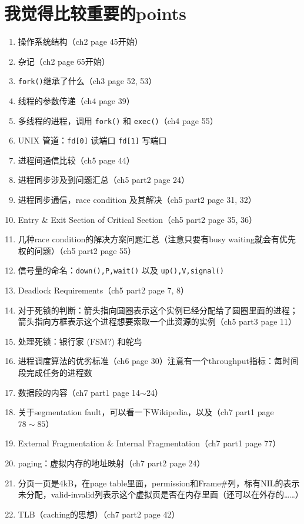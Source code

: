 \documentclass[]{report}
\begin{document}
	\section{我觉得比较重要的points}
	\begin{enumerate}
		\item 操作系统结构（ch2 page 45开始）
		\item 杂记（ch2 page 65开始）
		\item \verb|fork()|继承了什么（ch3 page 52, 53）
		\item 线程的参数传递（ch4 page 39）
		\item 多线程的进程，调用 \verb|fork()| 和 \verb|exec()|（ch4 page 55）
		\item UNIX 管道：\verb|fd[0]| 读端口 \verb|fd[1]| 写端口
		\item 进程间通信比较（ch5 page 44）
		\item 进程同步涉及到问题汇总（ch5 part2 page 24）
		\item 进程同步通信，race condition 及其解决（ch5 part2 page 31, 32）
		\item Entry \& Exit Section of Critical Section（ch5 part2 page 35, 36）
		\item 几种race condition的解决方案问题汇总（注意只要有busy waiting就会有优先权的问题）（ch5 part2 page 55）
		\item 信号量的命名：\verb|down(),P,wait()| 以及 \verb|up(),V,signal()|
		\item Deadlock Requirements（ch5 part2 page 7, 8）
		\item 对于死锁的判断：箭头指向圆圈表示这个实例已经分配给了圆圈里面的进程；箭头指向方框表示这个进程想要索取一个此资源的实例（ch5 part3 page 11）
		\item 处理死锁：银行家 (FSM?) 和鸵鸟
		\item 进程调度算法的优劣标准（ch6 page 30）注意有一个throughput指标：每时间段完成任务的进程数
		\item 数据段的内容（ch7 part1 page 14$\sim$24）
		\item 关于segmentation fault，可以看一下Wikipedia，以及（ch7 part1 page $78\sim85$）
		\item External Fragmentation \& Internal Fragmentation（ch7 part1 page 77）
		\item paging：虚拟内存的地址映射（ch7 part2 page 24）
		\item 分页一页是4kB，在page table里面，permission和Frame\#列，标有NIL的表示未分配，valid-invalid列表示这个虚拟页是否在内存里面（还可以在外存的……）
		\item TLB（caching的思想）（ch7 part2 page 42）

\end{enumerate}
\end{document}
